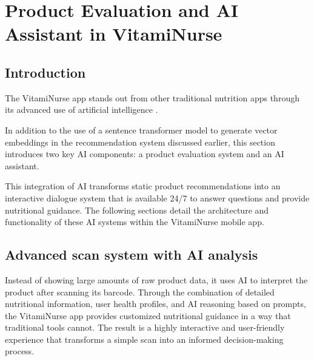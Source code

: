 

\chapter{Product Evaluation and AI Assistant in VitamiNurse}
\section*{Introduction}
The VitamiNurse app stands out from other traditional nutrition apps through its advanced use of artificial intelligence .

In addition to the use of a sentence transformer model to generate vector embeddings in the recommendation system discussed earlier, this section introduces two key AI components: a product evaluation system and an AI assistant.

This integration of AI transforms static product recommendations into an interactive dialogue system that is available 24/7 to answer questions and provide nutritional guidance. The following sections detail the architecture and functionality of these AI systems within the VitamiNurse mobile app.

\section{Advanced scan system with AI analysis }

Instead of showing large amounts of raw product data, it uses AI to interpret the product after scanning its barcode.  Through the combination of detailed nutritional information, user health profiles, and AI reasoning based on prompts, the VitamiNurse app provides customized nutritional guidance in a way that traditional tools cannot. The result is a highly interactive and user-friendly experience that transforms a simple scan into an informed decision-making process.

